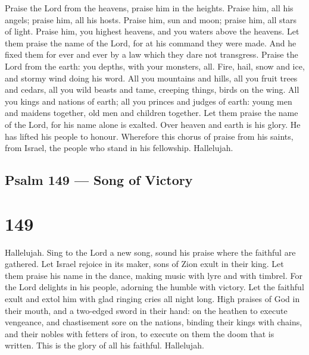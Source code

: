  Praise the Lord from the heavens, praise him in the
heights.  Praise him, all his angels; praise him, all his
hosts.  Praise him, sun and moon; praise him, all stars of
light.  Praise him, you highest heavens, and you waters
above the heavens.  Let them praise the name of the Lord,
for at his command they were made.  And he fixed them for
ever and ever by a law which they dare not transgress. 
Praise the Lord from the earth: you depths, with your monsters, all.
 Fire, hail, snow and ice, and stormy wind doing his word.
 All you mountains and hills, all you fruit trees and
cedars,  all you wild beasts and tame, creeping things,
birds on the wing.  All you kings and nations of earth; all
you princes and judges of earth:  young men and maidens
together, old men and children together.  Let them praise
the name of the Lord, for his name alone is exalted. Over heaven and
earth is his glory.  He has lifted his people to honour.
Wherefore this chorus of praise from his saints, from Israel, the people
who stand in his fellowship. Hallelujah.

\hypertarget{psalm-149-song-of-victory}{%
\subsection{Psalm 149 --- Song of
Victory}\label{psalm-149-song-of-victory}}

\hypertarget{section-148}{%
\section{149}\label{section-148}}

 Hallelujah. Sing to the Lord a new song, sound his praise
where the faithful are gathered.  Let Israel rejoice in its
maker, sons of Zion exult in their king.  Let them praise
his name in the dance, making music with lyre and with timbrel.
 For the Lord delights in his people, adorning the humble
with victory.  Let the faithful exult and extol him with
glad ringing cries all night long.  High praises of God in
their mouth, and a two-edged sword in their hand:  on the
heathen to execute vengeance, and chastisement sore on the nations,
 binding their kings with chains, and their nobles with
fetters of iron,  to execute on them the doom that is
written. This is the glory of all his faithful. Hallelujah.

